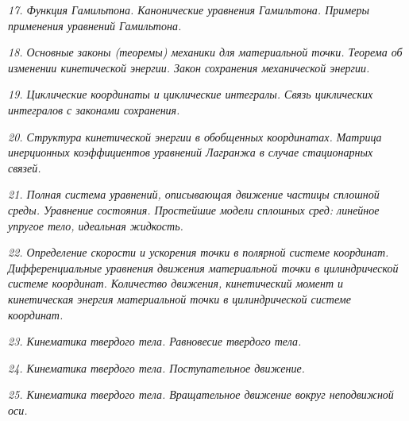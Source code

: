 \newpage %

\emph{17. Функция Гамильтона. Канонические уравнения Гамильтона. Примеры
применения уравнений Гамильтона.}

\newpage %

\emph{18. Основные законы (теоремы) механики для материальной точки. Теорема об
изменении кинетической энергии. Закон сохранения механической энергии.}

\newpage %

\emph{19. Циклические координаты и циклические интегралы. Связь циклических
интегралов с законами сохранения.}

\newpage %

\emph{20. Структура кинетической энергии в обобщенных координатах. Матрица
инерционных коэффициентов уравнений Лагранжа в случае стационарных связей.}

\newpage %

\emph{21. Полная система уравнений, описывающая движение частицы сплошной
среды. Уравнение состояния. Простейшие модели сплошных сред: линейное
упругое тело, идеальная жидкость.}

\newpage %

\emph{22. Определение скорости и ускорения точки в полярной системе координат.
Дифференциальные уравнения движения материальной точки в цилиндрической
системе координат. Количество движения, кинетический момент и кинетическая
энергия материальной точки в цилиндрической системе координат.}

\newpage %

\emph{23. Кинематика твердого тела. Равновесие твердого тела.}

\newpage %

\emph{24. Кинематика твердого тела. Поступательное движение.}

\newpage %

\emph{25. Кинематика твердого тела. Вращательное движение вокруг неподвижной
оси.}

